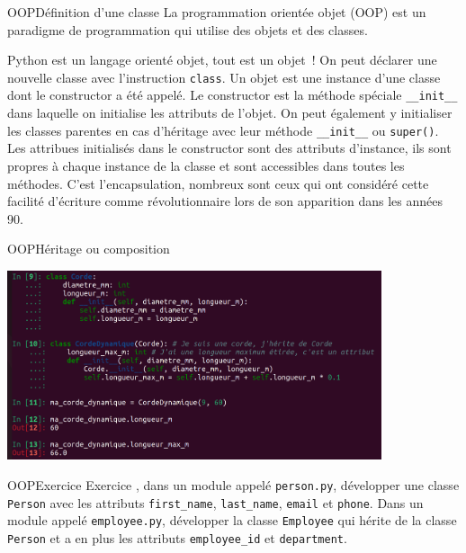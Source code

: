 \documentclass{beamer}
\begin{document}
    \begin{frame}{OOP}{Définition d'une classe}
        La programmation orientée objet (OOP) est un paradigme de programmation qui utilise des objets et des classes.

        Python est un langage orienté objet, tout est un objet~!
        On peut déclarer une nouvelle classe avec l'instruction \lstinline{class}.
        \bigbreak
        Un objet est une instance d'une classe dont le constructor a été appelé.
        Le constructor est la méthode spéciale \lstinline{__init__} dans laquelle on initialise les attributs de l'objet.
        On peut également y initialiser les classes parentes en cas d'héritage avec leur méthode \lstinline{__init__} ou \lstinline{super()}.
        \bigbreak
        Les attribues initialisés dans le constructor sont des attributs d'instance, ils sont propres à chaque instance de la classe et sont accessibles dans toutes les méthodes.
        C'est l'encapsulation, nombreux sont ceux qui ont considéré cette facilité d'écriture comme révolutionnaire lors de son apparition dans les années 90.
    \end{frame}

    \begin{frame}{OOP}{Héritage ou composition}

        \centering
        \includegraphics[width=11cm]{image/inheritance-or-composition}
    \end{frame}

    \begin{frame}{OOP}{Exercice}
        Exercice \execcounterdispinc{}, dans un module appelé \lstinline{person.py}, développer une classe \lstinline{Person} avec les attributs \lstinline{first_name}, \lstinline{last_name}, \lstinline{email} et \lstinline{phone}.
        \bigbreak
        Dans un module appelé \lstinline{employee.py}, développer la classe \lstinline{Employee} qui hérite de la classe \lstinline{Person} et a en plus les attributs \lstinline{employee_id} et \lstinline{department}.
    \end{frame}
\end{document}
